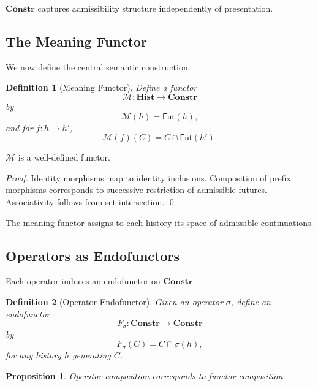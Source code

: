 \documentclass[11pt]{article}
\newtheorem{definition}{Definition}
\newtheorem{proposition}{Proposition}
\begin{document}
$\mathbf{Constr}$ captures admissibility structure independently of presentation.

\subsection{The Meaning Functor}

We now define the central semantic construction.

\begin{definition}[Meaning Functor]
Define a functor
\[
\mathcal{M} : \mathbf{Hist} \to \mathbf{Constr}
\]
by
\[
\mathcal{M}(h) = \mathsf{Fut}(h),
\]
and for $f : h \to h'$,
\[
\mathcal{M}(f)(C) = C \cap \mathsf{Fut}(h').
\]
\end{definition}

\begin{theorem}[Functoriality]
$\mathcal{M}$ is a well-defined functor.
\end{theorem}

\begin{proof}
Identity morphisms map to identity inclusions. Composition of prefix morphisms
corresponds to successive restriction of admissible futures. Associativity
follows from set intersection. \qed
\end{proof}

The meaning functor assigns to each history its space of admissible continuations.

\subsection{Operators as Endofunctors}

Each operator induces an endofunctor on $\mathbf{Constr}$.

\begin{definition}[Operator Endofunctor]
Given an operator $\sigma$, define an endofunctor
\[
F_\sigma : \mathbf{Constr} \to \mathbf{Constr}
\]
by
\[
F_\sigma(C) = C \cap \sigma(h),
\]
for any history $h$ generating $C$.
\end{definition}

\begin{proposition}
Operator composition corresponds to functor composition.
\end{proposition}
\end{document}
